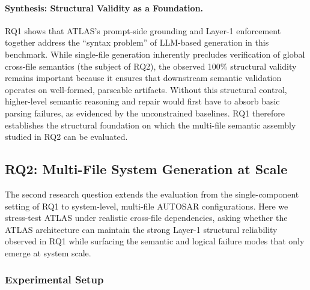 \documentclass[acmlarge,nonacm]{acmart}
\theoremstyle{acmplain}
\theoremstyle{acmdefinition}
\begin{document}
\paragraph{Synthesis: Structural Validity as a Foundation.}
RQ1 shows that ATLAS's prompt-side grounding and Layer-1 enforcement together address the ``syntax problem'' of LLM-based generation in this benchmark.
While single-file generation inherently precludes verification of global cross-file semantics (the subject of RQ2), the observed 100\% structural validity remains important because it ensures that downstream semantic validation operates on well-formed, parseable artifacts.
Without this structural control, higher-level semantic reasoning and repair would first have to absorb basic parsing failures, as evidenced by the unconstrained baselines.
RQ1 therefore establishes the structural foundation on which the multi-file semantic assembly studied in RQ2 can be evaluated.
\subsection{RQ2: Multi-File System Generation at Scale}
\label{sec:rq2-multifile-autosar}

The second research question extends the evaluation from the single-component setting of RQ1 to system-level, multi-file AUTOSAR configurations. Here we stress-test ATLAS under realistic cross-file dependencies, asking whether the ATLAS architecture can maintain the strong Layer-1 structural reliability observed in RQ1 while surfacing the semantic and logical failure modes that only emerge at system scale.


\subsubsection{Experimental Setup}
\label{sec:rq2-setup}
\end{document}
